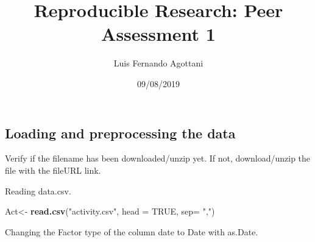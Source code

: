 \documentclass[]{article}
\title{Reproducible Research: Peer Assessment 1}
\author{Luis Fernando Agottani}
\date{09/08/2019}
\newenvironment{Shaded}{\begin{snugshade}}{\end{snugshade}}
\newcommand{\ControlFlowTok}[1]{\textcolor[rgb]{0.13,0.29,0.53}{\textbf{#1}}}
\newcommand{\DataTypeTok}[1]{\textcolor[rgb]{0.13,0.29,0.53}{#1}}
\newcommand{\KeywordTok}[1]{\textcolor[rgb]{0.13,0.29,0.53}{\textbf{#1}}}
\newcommand{\NormalTok}[1]{#1}
\newcommand{\OperatorTok}[1]{\textcolor[rgb]{0.81,0.36,0.00}{\textbf{#1}}}
\newcommand{\OtherTok}[1]{\textcolor[rgb]{0.56,0.35,0.01}{#1}}
\newcommand{\StringTok}[1]{\textcolor[rgb]{0.31,0.60,0.02}{#1}}
\begin{document}
\maketitle

\hypertarget{loading-and-preprocessing-the-data}{%
\subsection{Loading and preprocessing the
data}\label{loading-and-preprocessing-the-data}}

Verify if the filename has been downloaded/unzip yet. If not,
download/unzip the file with the fileURL link.

\begin{Shaded}
\end{Shaded}

Reading data.csv.

\begin{Shaded}
\begin{Highlighting}[]
\NormalTok{Act<-}\StringTok{ }\KeywordTok{read.csv}\NormalTok{(}\StringTok{"activity.csv"}\NormalTok{, }
               \DataTypeTok{head =} \OtherTok{TRUE}\NormalTok{, }\DataTypeTok{sep=} \StringTok{","}\NormalTok{)}
\end{Highlighting}
\end{Shaded}

Changing the Factor type of the column date to Date with as.Date.

\begin{Shaded}
\end{Shaded}
\end{document}
